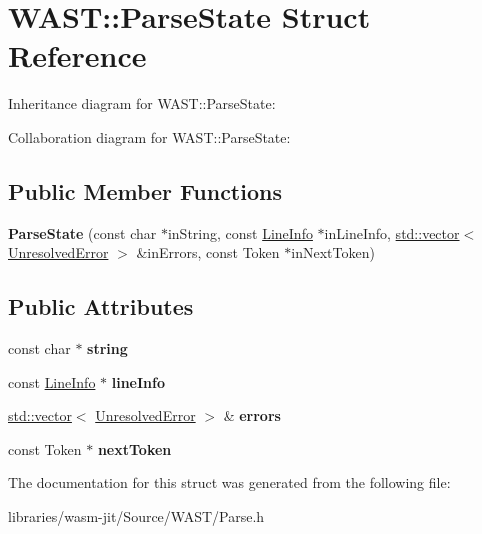 \hypertarget{struct_w_a_s_t_1_1_parse_state}{}\section{W\+A\+ST\+:\+:Parse\+State Struct Reference}
\label{struct_w_a_s_t_1_1_parse_state}


Inheritance diagram for W\+A\+ST\+:\+:Parse\+State\+:


Collaboration diagram for W\+A\+ST\+:\+:Parse\+State\+:
\subsection*{Public Member Functions}
\begin{DoxyCompactItemize}
\item 
\mbox{\label{struct_w_a_s_t_1_1_parse_state_a80ce3e02bd5f5a10b35ace17f0f26ec2}} 
{\bfseries Parse\+State} (const char $\ast$in\+String, const \mbox{\hyperlink{struct_w_a_s_t_1_1_line_info}{Line\+Info}} $\ast$in\+Line\+Info, \mbox{\hyperlink{classstd_1_1vector}{std\+::vector}}$<$ \mbox{\hyperlink{struct_w_a_s_t_1_1_unresolved_error}{Unresolved\+Error}} $>$ \&in\+Errors, const Token $\ast$in\+Next\+Token)
\end{DoxyCompactItemize}
\subsection*{Public Attributes}
\begin{DoxyCompactItemize}
\item 
\mbox{\label{struct_w_a_s_t_1_1_parse_state_aa0756e24fc46d44cf21e3f447f7a8bde}} 
const char $\ast$ {\bfseries string}
\item 
\mbox{\label{struct_w_a_s_t_1_1_parse_state_a2f6f78f2d0ed37f48d49da19b52ccadd}} 
const \mbox{\hyperlink{struct_w_a_s_t_1_1_line_info}{Line\+Info}} $\ast$ {\bfseries line\+Info}
\item 
\mbox{\label{struct_w_a_s_t_1_1_parse_state_ac8bc40a0614e2b9aa88ca995dce9d7ba}} 
\mbox{\hyperlink{classstd_1_1vector}{std\+::vector}}$<$ \mbox{\hyperlink{struct_w_a_s_t_1_1_unresolved_error}{Unresolved\+Error}} $>$ \& {\bfseries errors}
\item 
\mbox{\label{struct_w_a_s_t_1_1_parse_state_aed44236c3beecfffdb5807d5a5af3e7a}} 
const Token $\ast$ {\bfseries next\+Token}
\end{DoxyCompactItemize}


The documentation for this struct was generated from the following file\+:\begin{DoxyCompactItemize}
\item 
libraries/wasm-\/jit/\+Source/\+W\+A\+S\+T/Parse.\+h\end{DoxyCompactItemize}
